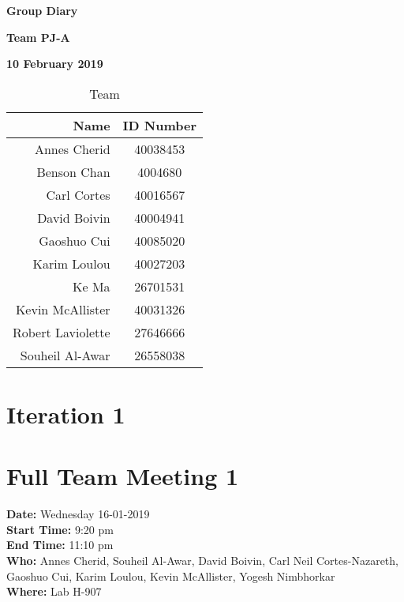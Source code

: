 \documentclass[12pt]{article}
\begin{document}
\vspace*{0.5in}
\centerline{\bf\Large Group Diary}

\vspace*{0.5in}
\centerline{\bf\Large Team PJ-A}

\vspace*{0.5in}
\centerline{\bf\Large 10 February 2019}

\vspace*{1.5in}
\begin{table}[htbp]
\caption{Team}
\begin{center}
\begin{tabular}{|r | c|}
\hline
Name & ID Number \\
\hline\hline
Annes Cherid & 40038453\\
Benson Chan & 4004680\\
Carl Cortes & 40016567\\
David Boivin & 40004941\\
Gaoshuo Cui & 40085020\\
Karim Loulou & 40027203\\
Ke Ma & 26701531\\
Kevin McAllister & 40031326\\
Robert Laviolette & 27646666\\
Souheil Al-Awar & 26558038\\
\hline
\end{tabular}
\end{center}
\end{table}

\clearpage
\section{Iteration 1}
\section {Full Team Meeting 1}
{\bf Date:} Wednesday 16-01-2019\\
{\bf Start Time:} 9:20 pm\\
{\bf End Time:} 11:10 pm \\
{\bf Who:} Annes Cherid, Souheil Al-Awar, David Boivin, Carl Neil Cortes-Nazareth, Gaoshuo Cui, Karim	Loulou, Kevin McAllister, Yogesh Nimbhorkar\\
{\bf Where:} Lab H-907 \\
\end{document}
